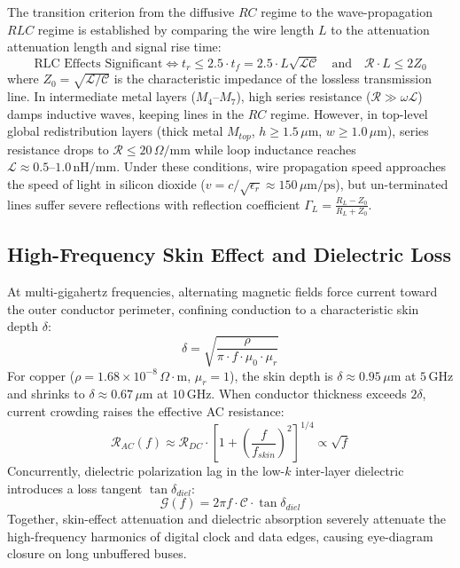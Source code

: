 The transition criterion from the diffusive $RC$ regime to the wave-propagation $RLC$ regime is established by comparing the wire length $L$ to the attenuation attenuation length and signal rise time:
\begin{equation}
\text{RLC Effects Significant} \iff t_r \le 2.5 \cdot t_f = 2.5 \cdot L \sqrt{\mathcal{L}\mathcal{C}} \quad \text{and} \quad \mathcal{R} \cdot L \le 2 Z_0
\label{eq:ch1_rlc_condition}
\end{equation}
where $Z_0 = \sqrt{\mathcal{L}/\mathcal{C}}$ is the characteristic impedance of the lossless transmission line. In intermediate metal layers ($M_4\text{--}M_7$), high series resistance ($\mathcal{R} \gg \omega \mathcal{L}$) damps inductive waves, keeping lines in the $RC$ regime. However, in top-level global redistribution layers (thick metal $M_{top}$, $h \ge 1.5\,\mu\mathrm{m}$, $w \ge 1.0\,\mu\mathrm{m}$), series resistance drops to $\mathcal{R} \le 20\,\Omega/\mathrm{mm}$ while loop inductance reaches $\mathcal{L} \approx 0.5\text{--}1.0\,\mathrm{nH/mm}$. Under these conditions, wire propagation speed approaches the speed of light in silicon dioxide ($v = c / \sqrt{\epsilon_r} \approx 150\,\mu\mathrm{m/ps}$), but un-terminated lines suffer severe reflections with reflection coefficient $\Gamma_L = \frac{R_L - Z_0}{R_L + Z_0}$.

\subsection{High-Frequency Skin Effect and Dielectric Loss}
\label{subsec:ch1_skin_effect}

At multi-gigahertz frequencies, alternating magnetic fields force current toward the outer conductor perimeter, confining conduction to a characteristic skin depth $\delta$:
\begin{equation}
\delta = \sqrt{\frac{\rho}{\pi \cdot f \cdot \mu_0 \cdot \mu_r}}
\label{eq:ch1_skin_depth}
\end{equation}
For copper ($\rho = 1.68 \times 10^{-8}\,\Omega\cdot\mathrm{m}$, $\mu_r = 1$), the skin depth is $\delta \approx 0.95\,\mu\mathrm{m}$ at $5\,\mathrm{GHz}$ and shrinks to $\delta \approx 0.67\,\mu\mathrm{m}$ at $10\,\mathrm{GHz}$. When conductor thickness exceeds $2\delta$, current crowding raises the effective AC resistance:
\begin{equation}
\mathcal{R}_{AC}(f) \approx \mathcal{R}_{DC} \cdot \left[ 1 + \left(\frac{f}{f_{skin}}\right)^2 \right]^{1/4} \propto \sqrt{f}
\label{eq:ch1_ac_resistance}
\end{equation}
Concurrently, dielectric polarization lag in the low-$k$ inter-layer dielectric introduces a loss tangent $\tan \delta_{diel}$:
\begin{equation}
\mathcal{G}(f) = 2 \pi f \cdot \mathcal{C} \cdot \tan \delta_{diel}
\label{eq:ch1_dielectric_loss}
\end{equation}
Together, skin-effect attenuation and dielectric absorption severely attenuate the high-frequency harmonics of digital clock and data edges, causing eye-diagram closure on long unbuffered buses.

